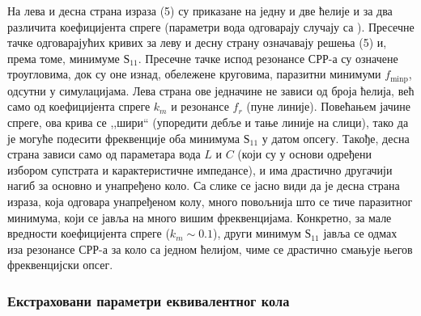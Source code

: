\documentclass[main.tex]{subfiles}
\begin{document}
На  лева и десна страна израза (5) су приказане на једну и две ћелије и за два различита коефицијента спреге (параметри вода одговарају случају са ). Пресечне тачке одговарајућих кривих за леву и десну страну означавају решења (5) и, према томе, минимуме $Ѕ_{11}$. Пресечне тачке испод резонансе СРР-а су означене троугловима, док су оне изнад, обележене круговима, паразитни минимуми $f_\text{minp}$, одсутни у симулацијама. Лева страна ове једначине не зависи од броја ћелија, већ само од коефицијента спреге $k_m$ и резонансе $f_r$ (пуне линије). Повећањем јачине спреге, ова крива се ,,шири`` (упоредити дебље и тање линије на слици), тако да је могуће подесити фреквенције оба минимума $Ѕ_{11}$ у датом опсегу. Такође, десна страна зависи само од параметара вода $L$ и $C$ (који су у основи одређени избором супстрата и карактеристичне импедансе), и има драстично другачији нагиб за основно и унапређено коло. Са слике се јасно види да је десна страна израза, која одговара унапређеном колу, много повољнија што се тиче паразитног минимума, који се јавља на много вишим фреквенцијама. Конкретно, за мале вредности коефицијента спреге ($k_m\sim \num{0.1}$), други минимум $Ѕ_{11}$ јавља се одмах иза резонансе СРР-а за коло са једном ћелијом, чиме се драстично смањује његов фреквенцијски опсег.

\subsubsection{Екстраховани параметри еквивалентног кола}
\end{document}
